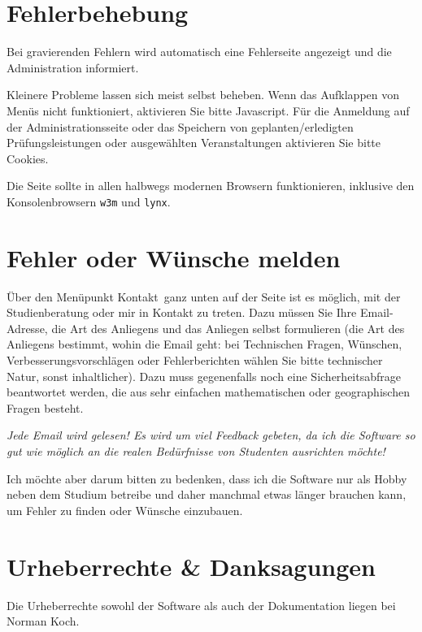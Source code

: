\section{Fehlerbehebung}

Bei gravierenden Fehlern wird automatisch eine Fehlerseite angezeigt und die Administration informiert. 

Kleinere Probleme lassen sich meist selbst beheben. Wenn das Aufklappen von Menüs nicht funktioniert,
aktivieren Sie bitte Javascript. Für die Anmeldung auf der Administrationsseite oder das
Speichern von geplanten/erledigten Prüfungsleistungen oder ausgewählten Veranstaltungen
aktivieren Sie bitte Cookies.

Die Seite sollte in allen halbwegs modernen Browsern funktionieren, inklusive den Konsolenbrowsern \texttt{w3m}
und \texttt{lynx}.

\section{Fehler oder Wünsche melden}

Über den Menüpunkt \frq Kontakt\flq\ ganz unten auf der Seite ist es möglich, mit der Studienberatung oder
mir in Kontakt zu treten. Dazu müssen Sie Ihre Email-Adresse, die Art des Anliegens und das Anliegen selbst
formulieren (die Art des Anliegens bestimmt, wohin die Email geht: bei Technischen Fragen, Wünschen,
Verbesserungsvorschlägen oder Fehlerberichten wählen Sie bitte \frq technischer Natur\flq, sonst
\frq inhaltlicher\flq). Dazu muss gegenenfalls noch eine Sicherheitsabfrage beantwortet werden, die aus
sehr einfachen mathematischen oder geographischen Fragen besteht.

\textit{Jede Email wird gelesen! Es wird um viel Feedback gebeten, da ich die Software so gut wie möglich an
die realen Bedürfnisse von Studenten ausrichten möchte!}

Ich möchte aber darum bitten zu bedenken, dass ich die Software nur als Hobby neben dem Studium betreibe
und daher manchmal etwas länger brauchen kann, um Fehler zu finden oder Wünsche einzubauen.



\section{Urheberrechte \& Danksagungen}

Die Urheberrechte sowohl der Software als auch der Dokumentation liegen bei Norman Koch.

